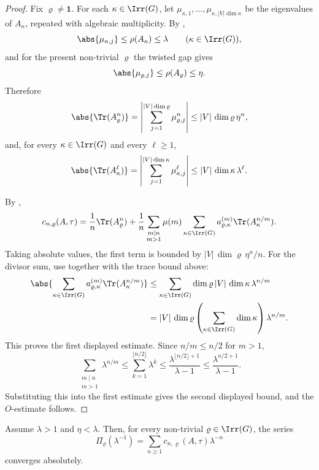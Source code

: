 \begin{proof}
  Fix \(\varrho\neq\mathbf 1\). For each
  \(\kappa\in\Irr(G)\), let
  \(\mu_{\kappa,1},\dots,\mu_{\kappa,|V|\dim\kappa}\) be the eigenvalues
  of \(A_\kappa\), repeated with algebraic multiplicity. By
  ,
  \[
    \abs{\mu_{\kappa,j}}\le \rho(A_\kappa)\le \lambda
    \qquad
    (\kappa\in\Irr(G)),
  \]
  and for the present non-trivial \(\varrho\) the twisted gap gives
  \[
    \abs{\mu_{\varrho,j}}\le \rho(A_\varrho)\le \eta.
  \]
  Therefore
  \[
    \abs{\Tr(A_\varrho^n)}
    =
    \left|\sum_{j=1}^{|V|\dim\varrho}\mu_{\varrho,j}^n\right|
    \le |V|\,\dim\varrho\,\eta^n,
  \]
  and, for every \(\kappa\in\Irr(G)\) and every \(\ell\ge 1\),
  \[
    \abs{\Tr(A_\kappa^\ell)}
    =
    \left|\sum_{j=1}^{|V|\dim\kappa}\mu_{\kappa,j}^\ell\right|
    \le |V|\,\dim\kappa\,\lambda^\ell.
  \]

  By ,
  \[
    c_{n,\varrho}(A,\tau)
    =
    \frac{1}{n}\Tr(A_\varrho^n)
    +\frac{1}{n}
      \sum_{\substack{m\mid n\\ m>1}}\mu(m)
        \sum_{\kappa\in\Irr(G)}
          a_{\varrho,\kappa}^{(m)}\Tr(A_\kappa^{n/m}).
  \]
  Taking absolute values, the first term is bounded by
  \(|V|\,\dim\varrho\,\eta^n/n\). For the divisor sum, use
   together with the trace bound
  above:
  \begin{align*}
    \abs{
      \sum_{\kappa\in\Irr(G)}
        a_{\varrho,\kappa}^{(m)}\Tr(A_\kappa^{n/m})
    }
    &\le
    \sum_{\kappa\in\Irr(G)}
      \dim\varrho\,|V|\,\dim\kappa\,\lambda^{n/m} \\
    &=
    |V|\,\dim\varrho
      \left(\sum_{\kappa\in\Irr(G)}\dim\kappa\right)\lambda^{n/m}.
  \end{align*}
  This proves the first displayed estimate. Since \(n/m\le n/2\) for
  \(m>1\),
  \[
    \sum_{\substack{m\mid n\\ m>1}}\lambda^{n/m}
    \le \sum_{k=1}^{\lfloor n/2\rfloor}\lambda^k
    \le \frac{\lambda^{\lfloor n/2\rfloor+1}}{\lambda-1}
    \le \frac{\lambda^{n/2+1}}{\lambda-1}.
  \]
  Substituting this into the first estimate gives the second displayed
  bound, and the \(O\)-estimate follows.
\end{proof}

\begin{lemma}
  \label{lem:nontrivial-perron-point-convergence}
  Assume \(\lambda>1\) and \(\eta<\lambda\). Then, for every non-trivial
  \(\varrho\in\Irr(G)\), the series
  \[
    \Pi_\varrho(\lambda^{-1})
    =\sum_{n\ge 1}c_{n,\varrho}(A,\tau)\lambda^{-n}
  \]
  converges absolutely.
\end{lemma}


